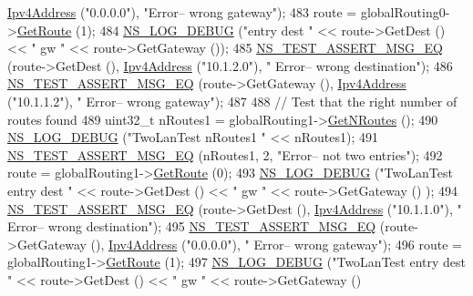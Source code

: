 \begin{DoxyCode}
      \hyperlink{classns3_1_1Ipv4Address}{Ipv4Address} (\textcolor{stringliteral}{"0.0.0.0"}), \textcolor{stringliteral}{"Error-- wrong gateway"});
483   route = globalRouting0->\hyperlink{classns3_1_1Ipv4GlobalRouting_accd518b9888908dbea189c1d1c73dcf1}{GetRoute} (1);
484   \hyperlink{group__logging_ga413f1886406d49f59a6a0a89b77b4d0a}{NS\_LOG\_DEBUG} (\textcolor{stringliteral}{"entry dest "} << route->GetDest () << \textcolor{stringliteral}{" gw "} << route->GetGateway ());
485   \hyperlink{group__testing_ga2a9d78cffb3db8e867c35fff0b698cf5}{NS\_TEST\_ASSERT\_MSG\_EQ} (route->GetDest (), \hyperlink{classns3_1_1Ipv4Address}{Ipv4Address} (\textcolor{stringliteral}{"10.1.2.0"}), \textcolor{stringliteral}{"
      Error-- wrong destination"});
486   \hyperlink{group__testing_ga2a9d78cffb3db8e867c35fff0b698cf5}{NS\_TEST\_ASSERT\_MSG\_EQ} (route->GetGateway (), \hyperlink{classns3_1_1Ipv4Address}{Ipv4Address} (\textcolor{stringliteral}{"10.1.1.2"}), \textcolor{stringliteral}{"
      Error-- wrong gateway"});
487 
488   \textcolor{comment}{// Test that the right number of routes found}
489   uint32\_t nRoutes1 = globalRouting1->\hyperlink{classns3_1_1Ipv4GlobalRouting_abb9d2b3642272b9bd2697a5699922fa7}{GetNRoutes} ();
490   \hyperlink{group__logging_ga413f1886406d49f59a6a0a89b77b4d0a}{NS\_LOG\_DEBUG} (\textcolor{stringliteral}{"TwoLanTest nRoutes1 "} << nRoutes1);
491   \hyperlink{group__testing_ga2a9d78cffb3db8e867c35fff0b698cf5}{NS\_TEST\_ASSERT\_MSG\_EQ} (nRoutes1, 2, \textcolor{stringliteral}{"Error-- not two entries"});
492   route = globalRouting1->\hyperlink{classns3_1_1Ipv4GlobalRouting_accd518b9888908dbea189c1d1c73dcf1}{GetRoute} (0);
493   \hyperlink{group__logging_ga413f1886406d49f59a6a0a89b77b4d0a}{NS\_LOG\_DEBUG} (\textcolor{stringliteral}{"TwoLanTest entry dest "} << route->GetDest () << \textcolor{stringliteral}{" gw "} << route->GetGateway ()
      );
494   \hyperlink{group__testing_ga2a9d78cffb3db8e867c35fff0b698cf5}{NS\_TEST\_ASSERT\_MSG\_EQ} (route->GetDest (), \hyperlink{classns3_1_1Ipv4Address}{Ipv4Address} (\textcolor{stringliteral}{"10.1.1.0"}), \textcolor{stringliteral}{"
      Error-- wrong destination"});
495   \hyperlink{group__testing_ga2a9d78cffb3db8e867c35fff0b698cf5}{NS\_TEST\_ASSERT\_MSG\_EQ} (route->GetGateway (), \hyperlink{classns3_1_1Ipv4Address}{Ipv4Address} (\textcolor{stringliteral}{"0.0.0.0"}), \textcolor{stringliteral}{"
      Error-- wrong gateway"});
496   route = globalRouting1->\hyperlink{classns3_1_1Ipv4GlobalRouting_accd518b9888908dbea189c1d1c73dcf1}{GetRoute} (1);
497   \hyperlink{group__logging_ga413f1886406d49f59a6a0a89b77b4d0a}{NS\_LOG\_DEBUG} (\textcolor{stringliteral}{"TwoLanTest entry dest "} << route->GetDest () << \textcolor{stringliteral}{" gw "} << route->GetGateway ()

\end{DoxyCode}
